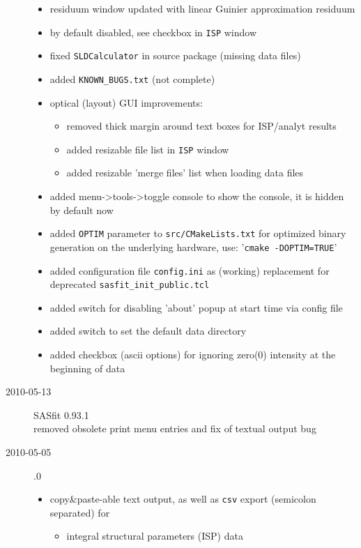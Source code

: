 \begin{description}
\begin{itemize}
        \item residuum window updated with linear Guinier approximation residuum
        \item by default disabled, see checkbox in \texttt{ISP} window
        \item fixed \texttt{SLDCalculator} in source package (missing data files)
        \item added \texttt{KNOWN\_BUGS.txt} (not complete)
        \item optical (layout) GUI improvements:
            \begin{itemize}
            \item removed thick margin around text boxes for ISP/analyt results
            \item added resizable file list in \texttt{ISP} window
            \item added resizable 'merge files' list when loading data files
            \end{itemize}
        \item added menu->tools->toggle console to show the console, it is hidden by default now
        \item added \texttt{OPTIM} parameter to \texttt{src/CMakeLists.txt} for optimized binary generation on the underlying hardware, use: '\texttt{cmake -DOPTIM=TRUE}'
        \item added configuration file \texttt{config.ini} as (working) replacement for deprecated \texttt{sasfit\_init\_public.tcl}
        \item added switch for disabling 'about' popup at start time via config file
        \item added switch to set the default data directory
        \item added checkbox (ascii options) for ignoring zero(0) intensity at the beginning of data
        \end{itemize}
    \item[2010-05-13] SASfit 0.93.1 \\
    removed obsolete print menu entries and fix of textual output bug
    \item[2010-05-05] .0
        \begin{itemize}
            \item copy\&paste-able text output, as well as \texttt{csv} export (semicolon separated) for
            \begin{itemize}
                \item integral structural parameters (ISP) data

\end{itemize}
\end{itemize}
\end{description}
